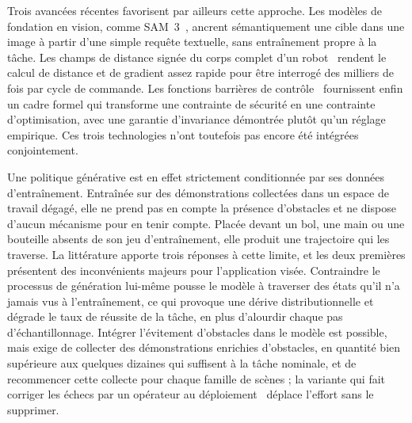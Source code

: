 Trois avancées récentes favorisent par ailleurs cette approche. Les modèles de fondation en vision, comme \ac{SAM}~3~\cite{Meta2025Sam3}, ancrent sémantiquement une cible dans une image à partir d'une simple requête textuelle, sans entraînement propre à la tâche. Les champs de distance signée du corps complet d'un robot~\cite{Li2024rdf} rendent le calcul de distance et de gradient assez rapide pour être interrogé des milliers de fois par cycle de commande. Les fonctions barrières de contrôle~\cite{Ames2019Control} fournissent enfin un cadre formel qui transforme une contrainte de sécurité en une contrainte d'optimisation, avec une garantie d'invariance démontrée plutôt qu'un réglage empirique. Ces trois technologies n'ont toutefois pas encore été intégrées conjointement.

Une politique générative est en effet strictement conditionnée par ses données d'entraînement. Entraînée sur des démonstrations collectées dans un espace de travail dégagé, elle ne prend pas en compte la présence d'obstacles et ne dispose d'aucun mécanisme pour en tenir compte. Placée devant un bol, une main ou une bouteille absents de son jeu d'entraînement, elle produit une trajectoire qui les traverse. La littérature apporte trois réponses à cette limite, et les deux premières présentent des inconvénients majeurs pour l'application visée. Contraindre le processus de génération lui-même pousse le modèle à traverser des états qu'il n'a jamais vus à l'entraînement, ce qui provoque une dérive distributionnelle et dégrade le taux de réussite de la tâche, en plus d'alourdir chaque pas d'échantillonnage. Intégrer l'évitement d'obstacles dans le modèle est possible, mais exige de collecter des démonstrations enrichies d'obstacles, en quantité bien supérieure aux quelques dizaines qui suffisent à la tâche nominale, et de recommencer cette collecte pour chaque famille de scènes ; la variante qui fait corriger les échecs par un opérateur au déploiement~\cite{Welte2026Flowcorrect} déplace l'effort sans le supprimer.

